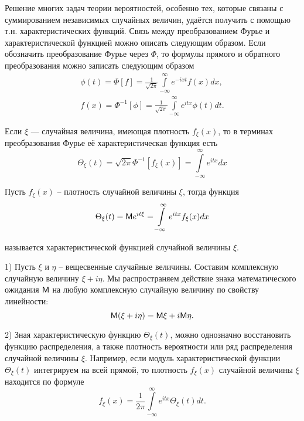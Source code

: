 
\begin{zam}
\label{zam:24.1}
Решение многих задач теории вероятностей, особенно тех, которые связаны с суммированием независимых случайных величин, удаётся получить с помощью т.н. характеристических функций.
Связь между преобразованием Фурье и характеристической функцией можно описать следующим образом. Если обозначить преобразование Фурье через $\Phi$, то формулы прямого и обратного преобразования можно записать
следующим образом
\begin{gather*}
	\phi(t) = \Phi[f] = \frac{1}{\sqrt{2\pi}}\int\limits_{-\infty}^{\infty}e^{-ixt}f(x)dx, \\
	f(x) = \Phi^{-1}[\phi] = \frac{1}{\sqrt{2\pi}} \int\limits_{-\infty}^{\infty}e^{itx}\phi(t)dt.   
\end{gather*}

Если $\xi$ — случайная величина, имеющая плотность $f_{\xi}(x)$, то в терминах преобразования Фурье её характеристическая функция есть
$$\Theta_{\xi} (t) = \sqrt{2\pi}\Phi^{-1}[f_{\xi}(x)] = \int\limits_{-\infty}^{\infty}e^{itx}dx$$
\end{zam}

\begin{definition}
\label{def:24.2}
	Пусть $f_{\xi}(x)$ -- плотность случайной величины $\xi$,
тогда функция
$$\Theta_{\xi}(t) = \mathsf{M} e^{it\xi} = \int\limits_{-\infty}^{\infty} e^{itx}f_{\xi}(x)dx$$

называется характеристической функцией случайной величины $\xi$.
\end{definition}

\begin{zam}\-
\label{zam:24.3}

1) Пусть $\xi$ и $\eta$ -- вещесвенные случайные величины. Составим комплексную случайную величину $\xi + i\eta$. Мы распространяем действие знака математического ожидания $\mathsf{M}$ на любую комплексную случайную величину по свойству линейности:
$$\mathsf{M}(\xi + i\eta) = \mathsf{M}\xi + i \mathsf{M}\eta.$$

2) Зная характеристическую функцию $\Theta_{\xi} (t)$, можно однозначно восстановить функцию распределения, а также плотность вероятности или ряд распределения случайной величины $\xi$. Например, если модуль характеристической функции $\Theta_{\xi} (t)$ интегрируем на всей прямой, то плотность $f_{\xi}(x)$
случайной величины $\xi$ находится по формуле
$$f_{\xi}(x) =\frac{1}{2\pi}\int\limits_{-\infty}^{\infty}e^{itx}\Theta_{\xi} (t) dt.$$
\end{zam}

